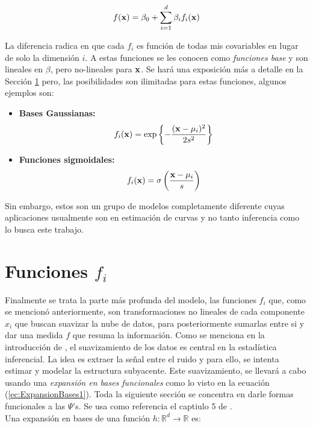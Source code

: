 \documentclass[../Main/Main.tex]{subfiles}
\begin{document}
\begin{align} 
	f(\mathbf{x}) = \beta_0 + \sum_{i = 1}^d\beta_i f_i(\mathbf{x}) \label{ec:ExpansionBases1}
\end{align}

La diferencia radica en que cada $f_i$ es función de todas mis covariables en lugar de solo la dimensión $i$. A estas funciones se les conocen como \textit{funciones base} y son lineales en $\beta$, pero no-lineales para $\mathbf{x}$. Se hará una exposición más a detalle en la Sección \ref{sec:fj} pero, las posibilidades son ilimitadas para estas funciones, algunos ejemplos son:

\begin{itemize}
	\item \textbf{Bases Gaussianas:}
	 $$f_i(\mathbf{x}) = 
	 \exp\left\{-\dfrac{(\mathbf{x} - \mu_i)^2}{2s^2}\right\}$$
	\item \textbf{Funciones sigmoidales:} 
	$$f_i(\mathbf{x}) = 
	\sigma\left( \dfrac{\mathbf{x} - \mu_i}{s} \right)$$
\end{itemize}

Sin embargo, estos son un grupo de modelos completamente diferente cuyas aplicaciones usualmente son en estimación de curvas y no tanto inferencia como lo busca este trabajo.

\section{Funciones $f_i$} \label{sec:fj}

Finalmente se trata la parte más profunda del modelo, las funciones $f_i$  que, como se mencionó anteriormente, son transformaciones no lineales de cada componente $x_i$ que buscan suavizar la nube de datos, para posteriormente sumarlas entre si y dar una medida $f$ que resuma la información. Como se menciona en la introducción de \autocite{hardle2004semiparametric}, el suavizamiento de los datos es central en la estadística inferencial. La idea es extraer la señal entre el ruido y para ello, se intenta estimar y modelar la estructura subyacente. Este suavizamiento, se llevará a cabo usando una \textit{expansión en bases funcionales} como lo visto en la ecuación (\ref{ec:ExpansionBases1}). Toda la siguiente sección se concentra en darle formas funcionales a las $\Psi$'s. Se usa como   referencia el captiulo 5 de \autocite{hastie2008elements}. \\

Una expansión en bases de una función $h:\mathbb{R}^d\rightarrow\mathbb{R}$ es:
\end{document}
